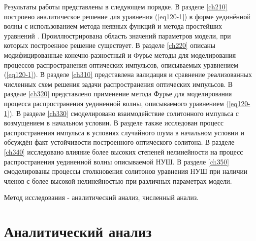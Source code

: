 \documentclass[14pt,a4paper]{extreport}
\begin{document}
			Результаты работы представлены в следующем порядке. 
			В разделе \ref{ch210} построено аналитическое решение для уравнения (\ref{eq120-1}) в форме уединённой волны с использованием метода неявных функций и метода простейших уравнений \cite{Rad4}. Проиллюстрирована область значений параметров модели, при которых построенное решение существует. 
			В разделе \ref{ch220} описаны модифицированные конечно-разностный и Фурье методы для моделирования процессов распространения оптических импульсов, описываемых уравнением (\ref{eq120-1}).
			В разделе \ref{ch310} представлена валидация и сравнение реализованных численных схем решения задачи распространения оптических импульсов.
			В разделе \ref{ch320} представлено применение метода Фурье для моделирования процесса распространения уединенной волны, описываемого уравнением (\ref{eq120-1}). 
			В разделе \ref{ch330} смоделировано взаимодействие солитонного импульса с возмущением в начальном условии. В разделе также исследован процесс распространения импульса в условиях случайного шума в начальном условии и обсуждён факт устойчивости построенного оптического солитона. 
			В разделе \ref{ch340} исследовано влияние более высоких степеней нелинейности на процесс распространения уединенной волны описываемой НУШ. 
			В разделе \ref{ch350} смоделированы процессы столкновения солитонов уравнения НУШ при наличии членов с более высокой нелинейностью при различных параметрах модели.

			Метод исследования - аналитический анализ, численный анализ.
	\newpage
	
	\section{Аналитический анализ}\label{ch200}
\end{document}
